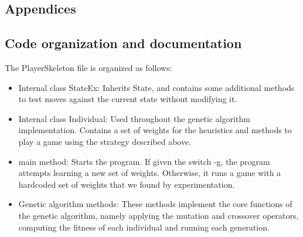 \documentclass[12pt,a4paper]{report}
\begin{document}
\begin{appendices}
\chapter*{Appendices}
\section{Code organization and documentation}
The PlayerSkeleton file is organized as follows:
\begin{itemize}
\item Internal class StateEx: Inherits State, and contains some additional methods to test moves against the current state without modifying it.
\item Internal class Individual: Used throughout the genetic algorithm implementation. Contains a set of weights for the heuristics and methods to play a game using the strategy described above.
\item main method: Starts the program. If given the switch -g, the program attempts learning a new set of weights. Otherwise, it runs a game with a hardcoded set of weights that we found by experimentation.
\item Genetic algorithm methods: These methods implement the core functions of the genetic algorithm, namely applying the mutation and crossover operators, computing the fitness of each individual and running each generation.
\end{itemize}
\end{appendices}



\end{document}
